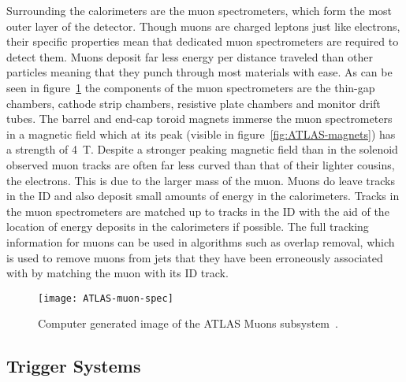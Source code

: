 Surrounding the calorimeters are the muon spectrometers, which form the most
outer layer of the detector. Though muons are charged leptons just like
electrons, their specific properties mean that dedicated muon spectrometers are
required to detect them. Muons deposit far less energy per distance traveled
than other particles meaning that they punch through most materials with ease.
As can be seen in figure~\ref{fig:ATLAS-muon} the components of the muon
spectrometers are the thin-gap chambers, cathode strip chambers, resistive plate
chambers and monitor drift tubes. The barrel and end-cap toroid magnets immerse
the muon spectrometers in a magnetic field which at its peak (visible in
figure~\ref{fig:ATLAS-magnets}) has a strength of 4~T. Despite a stronger
peaking magnetic field than in the solenoid observed muon tracks are often far
less curved than that of their lighter cousins, the electrons. This is due to the
larger mass of the muon. Muons do leave tracks in the ID and also deposit
small amounts of energy in the calorimeters. Tracks in the muon spectrometers are
matched up to tracks in the ID with the aid of the location of energy deposits
in the calorimeters if possible. The full tracking information for muons can be
used in algorithms such as overlap removal, which is used to remove muons from
jets that they have been erroneously associated with by matching the muon with
its ID track.
\begin{figure}[ht]
  \centering
  \texttt{[image: ATLAS-muon-spec]}
  \caption[ATLAS muon subsystem]{Computer generated image of the ATLAS Muons
    subsystem~\cite{ATLAS-muon-fig}.}%
  \label{fig:ATLAS-muon}
\end{figure}

\subsection{Trigger Systems}%
\label{sec:trigger}

